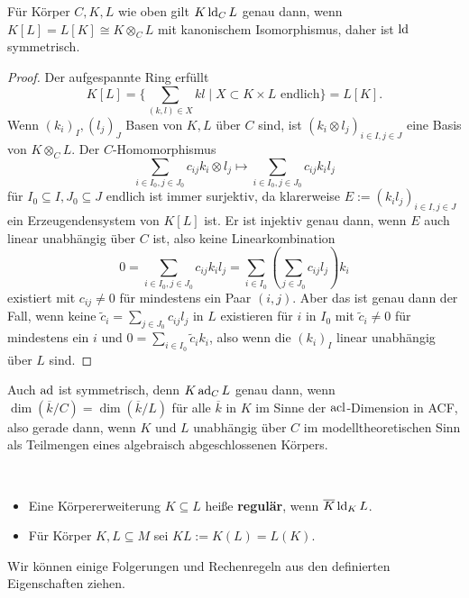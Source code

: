     \begin{lemma}\label{Tensoren}
    	Für Körper $C,K,L$ wie oben gilt $K\operatorname{ld}_CL$ genau dann, wenn\linebreak$K[L]=L[K]\cong K\otimes_CL$ mit kanonischem Isomorphismus, daher ist $\operatorname{ld}$ symmetrisch.
    \end{lemma}
    \begin{proof}
    	Der aufgespannte Ring erfüllt $$K[L]=\{\sum\limits_{(k,l)\in X}kl\mid X\subset K\times L\text{ endlich}\}=L[K].$$
    	Wenn $(k_i)_I,(l_j)_J$ Basen von $K,L$ über $C$ sind, ist $(k_i\otimes l_j)_{i\in I,j\in J}$ eine Basis von $K\otimes_CL$. Der $C$-Homomorphismus $$\sum\limits_{i\in I_0,j\in J_0} c_{ij}k_i\otimes l_j\mapsto \sum\limits_{i\in I_0,j\in J_0} c_{ij}k_il_j$$ für $I_0\subseteq I,J_0\subseteq J$ endlich ist immer surjektiv, da klarerweise $E:=(k_il_j)_{i\in I,j\in J}$ ein Erzeugendensystem von $K[L]$ ist. Er ist injektiv genau dann, wenn $E$ auch linear unabhängig über $C$ ist, also keine Linearkombination $$0=\sum\limits_{i\in I_0,j\in J_0}c_{ij}k_il_j=\sum\limits_{i\in I_0}(\sum\limits_{j\in J_0}c_{ij}l_j)k_i$$ existiert mit $c_{ij}\neq0$ für mindestens ein Paar $(i,j)$. Aber das ist genau dann der Fall, wenn keine $\tilde{c}_i=\sum\limits_{j\in J_0}c_{ij}l_j$ in $L$ existieren für $i$ in $I_0$ mit $\tilde{c}_i\neq0$ für mindestens ein $i$ und $0=\sum\limits_{i\in I_0}\tilde{c}_ik_i$, also wenn die $(k_i)_I$ linear unabhängig über $L$ sind.
    \end{proof}
    \begin{remark}
    	 Auch $\operatorname{ad}$ ist symmetrisch, denn $K\operatorname{ad}_CL$ genau dann, wenn $\dim(\overline{k}/C)=\dim(\overline{k}/L)$ für alle $\overline{k}$ in $K$ im Sinne der $\operatorname{acl}$-Dimension in ACF, also gerade dann, wenn $K$ und $L$ unabhängig über $C$ im modelltheoretischen Sinn als Teilmengen eines algebraisch abgeschlossenen Körpers.
    \end{remark}
    
    \begin{definition}
    	\ 
    	\begin{itemize}
    		\item Eine Körpererweiterung $K\subseteq L$ heiße \textbf{regulär}, wenn $\overline{K}\operatorname{ld}_KL$.
    		\item Für Körper $K,L\subseteq M$ sei $KL:=K(L)=L(K)$.
    	\end{itemize}
    \end{definition}
    
    Wir können einige Folgerungen und \glqq{}Rechenregeln\grqq{} aus den definierten Eigenschaften ziehen.
    
